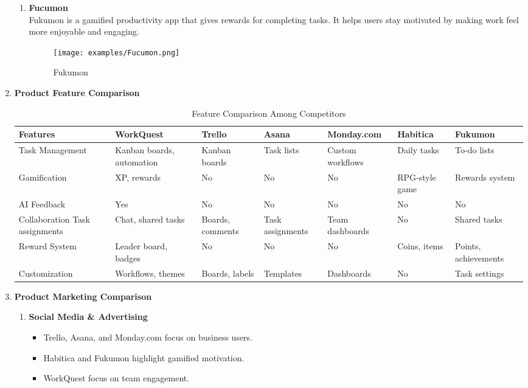\begin{enumerate}
\begin{enumerate}
    \item \textbf{Fucumon} \\
    Fukumon is a gamified productivity app that gives rewards for completing tasks. It helps users stay motivated by making work feel more enjoyable and engaging.  

    \begin{figure}[H]
        \centering
        \texttt{[image: examples/Fucumon.png]}
        \caption{Fukumon}
    \end{figure}   
    \end{enumerate}
    \item \textbf{Product Feature Comparison}

    \medskip
    \noindent\begin{center}
    \begin{table}[ht]
        \centering
        \footnotesize 
        \begin{tabularx}{\textwidth}{|X|X|X|X|X|X|X|}        
            \hline
            \rowcolor{gray!70}
            Features & WorkQuest & Trello & Asana & Monday.com & Habitica & Fukumon \\
            \hline
            Task Management & Kanban boards, automation & Kanban boards & Task lists & Custom workflows & Daily tasks & To-do lists \\
            \hline
            Gamification & XP, rewards & No & No & No & RPG-style game & Rewards system \\
            \hline
            AI Feedback & Yes & No & No & No & No & No \\
            \hline
            Collaboration Task assignments & Chat, shared tasks & Boards, comments & Task assignments & Team dashboards & No & Shared tasks \\
            \hline
            Reward System & Leader board, badges & No & No & No & Coins, items & Points, achievements \\
            \hline
            Customization & Workflows, themes & Boards, labels & Templates & Dashboards & No & Task settings \\
            \hline
        \end{tabularx}
        \caption{Feature Comparison Among Competitors}
        \label{tab:feature-comparison}
    \end{table}
    \end{center}
    \medskip

\item \textbf{Product Marketing Comparison}
    \begin{enumerate}
        \item \textbf{Social Media \& Advertising}
        \begin{itemize}
            \item Trello, Asana, and Monday.com focus on business users.
            \item Habitica and Fukumon highlight gamified motivation.
            \item WorkQuest focus on team engagement.
        \end{itemize}
        

\end{enumerate}
\end{enumerate}
